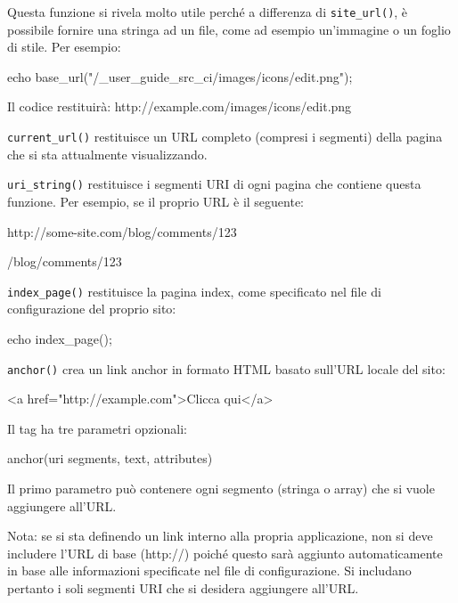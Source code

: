 Questa funzione si rivela molto utile perché a differenza di \verb|site_url()|, è possibile fornire una stringa ad un file, come ad esempio un'immagine o un foglio di stile. Per esempio:

\begin{code}
echo base_url("/_user_guide_src_ci/images/icons/edit.png");
\end{code}

Il codice restituirà: http://example.com/images/icons/edit.png

\verb|current_url()| restituisce un URL completo (compresi i segmenti) della pagina che si sta attualmente visualizzando.

\verb|uri_string()| restituisce i segmenti URI di ogni pagina che contiene questa funzione. Per esempio, se il proprio URL è il seguente:

\begin{code}
http://some-site.com/blog/comments/123
\end{code}

\begin{code}
/blog/comments/123
\end{code}

\verb|index_page()| restituisce la pagina index, come specificato nel file di configurazione del proprio sito:

\begin{code}
echo index_page();
\end{code}

\verb|anchor()| crea un link anchor in formato HTML basato sull'URL locale del sito:

\begin{code}
<a href="http://example.com">Clicca qui</a>
\end{code}

Il tag ha tre parametri opzionali:

\begin{code}
anchor(uri segments, text, attributes)
\end{code}

Il primo parametro può contenere ogni segmento (stringa o array) che si vuole aggiungere all'URL.

Nota: se si sta definendo un link interno alla propria applicazione, non si deve includere l'URL di base (http://\omissis) poiché questo sarà aggiunto automaticamente in base alle informazioni specificate nel file di configurazione. Si includano pertanto i soli segmenti URI che si desidera aggiungere all'URL.

